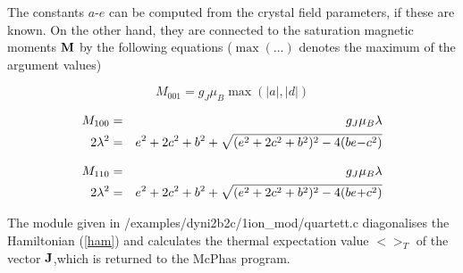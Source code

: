 The constants $a$-$e$ can be computed from the crystal field parameters, if
these are known. On the other hand, they are connected to the saturation
magnetic moments $\mathbf M$ by the following equations ($\max(...)$ denotes the
maximum of the argument values)

\begin{equation}
M_{001}=g_J \mu_B \max(|a|,|d|) 
\end{equation}

\begin{eqnarray}
M_{100}&=&g_J \mu_B \lambda\\
2\lambda^2&=&e^2+2c^2+b^2 + \sqrt{(e^2+2c^2+b^2)^2-4(be{\mathbf -}c^2)}
\end{eqnarray}

\begin{eqnarray}
M_{110}&=&g_J \mu_B  \lambda\\
2\lambda^2&=&e^2+2c^2+b^2 + \sqrt{(e^2+2c^2+b^2)^2-4(be{\mathbf +}c^2)}
\end{eqnarray}

The module given in {\prg /examples/dyni2b2c/1ion\_mod/quartett.c} diagonalises
the Hamiltonian (\ref{ham}) and calculates the thermal expectation 
value $<>_T$ of the vector $\mathbf J$,which
is returned to the {\prg McPhas} program.
